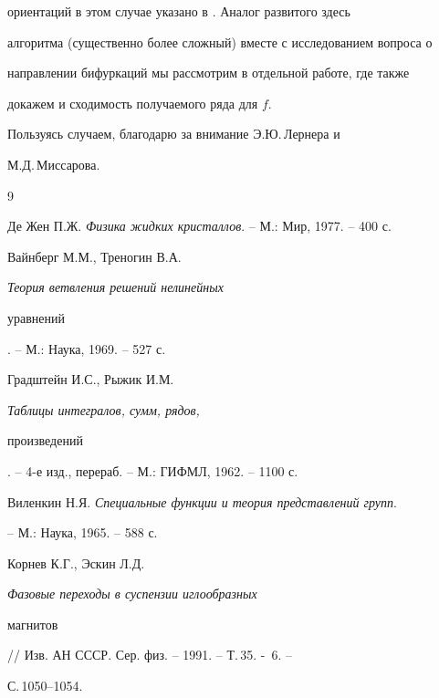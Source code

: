 ориентаций в этом случае указано в \cite{5}. Аналог развитого здесь


алгоритма (существенно более сложный) вместе с исследованием вопроса о


направлении бифуркаций мы рассмотрим в отдельной работе, где также


докажем и сходимость получаемого ряда для $f$.





Пользуясь случаем, благодарю за внимание Э.Ю.\,Лернера и


М.Д.\,Миссарова.





\begin{thebibliography}{9}













Де Жен П.Ж. {\em Физика жидких кристаллов}. -- М.: Мир, 1977. -- 400 с.




Вайнберг М.М., Треногин В.А. {\em Теория ветвления решений нелинейных


уравнений}. -- М.: Наука, 1969. -- 527 с.




Градштейн И.С., Рыжик И.М. {\em Таблицы интегралов, сумм, рядов,


произведений}. -- 4-е изд., перераб. -- М.: ГИФМЛ, 1962. -- 1100 с.




Виленкин Н.Я. {\em Специальные функции и теория представлений групп}.


-- М.: Наука, 1965. -- 588 с.




Корнев К.Г., Эскин Л.Д. {\em Фазовые переходы в суспензии иглообразных


магнитов} // Изв. АН СССР. Сер. физ. -- 1991. -- Т.\,35. - \No\,6. --


С.\,1050--1054.





\end{thebibliography}





\vskip 2cm












\label{end}





